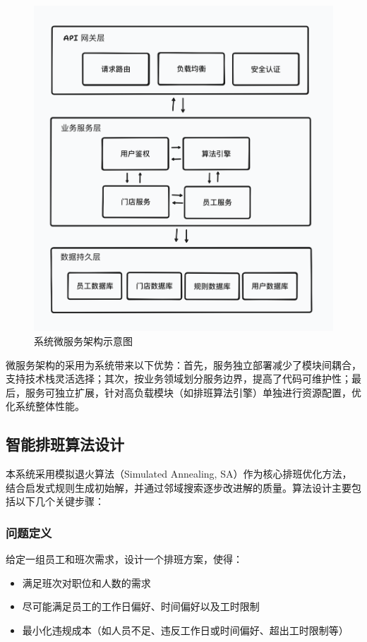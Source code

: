 \documentclass{ctexart}
\begin{document}
\begin{figure}[H]
    \centering
    \includegraphics[width=0.8\linewidth]{./source/微服务架构图.png}
    \caption{系统微服务架构示意图}
    \label{fig:microservice-arch}
\end{figure}

微服务架构的采用为系统带来以下优势：首先，服务独立部署减少了模块间耦合，支持技术栈灵活选择；其次，按业务领域划分服务边界，提高了代码可维护性；最后，服务可独立扩展，针对高负载模块（如排班算法引擎）单独进行资源配置，优化系统整体性能。

\subsection{智能排班算法设计}
本系统采用模拟退火算法（Simulated Annealing, SA）作为核心排班优化方法，结合启发式规则生成初始解，并通过邻域搜索逐步改进解的质量。算法设计主要包括以下几个关键步骤：

\subsubsection{问题定义}
给定一组员工和班次需求，设计一个排班方案，使得：
\begin{itemize}
    \item 满足班次对职位和人数的需求
    \item 尽可能满足员工的工作日偏好、时间偏好以及工时限制
    \item 最小化违规成本（如人员不足、违反工作日或时间偏好、超出工时限制等）
\end{itemize}
\end{document}
